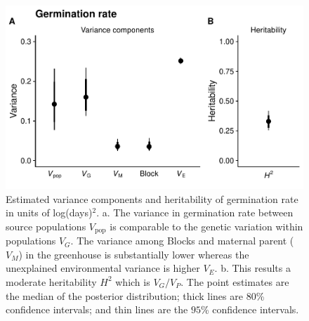 \documentclass[
  12pt,
]{article}
\begin{document}
\begin{figure}[ht]
  \includegraphics[width=\textwidth]{figures/h2-germ.pdf}
  \caption{Estimated variance components and heritability of germination rate in units of log(days)$^2$. a. The variance in germination rate between source populations $V_\text{pop}$ is comparable to the genetic variation within populations $V_G$. The variance among Blocks and maternal parent ($V_M$) in the greenhouse is substantially lower whereas the unexplained environmental variance is higher $V_E$. b. This results a moderate heritability $H^2$ which is $V_G / V_P$. The point estimates are the median of the posterior distribution; thick lines are $80$\% confidence intervals; and thin lines are the $95$\% confidence intervals.}
  \label{fig:h2-germ}
\end{figure}
\end{document}
